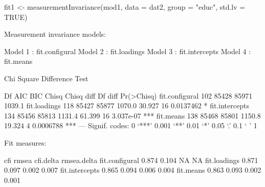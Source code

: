\begin{Schunk}
\begin{Sinput}
 fit1 <- measurementInvariance(mod1,
                               data = dat2,
                               group = "educ",
                               std.lv = TRUE)
\end{Sinput}
\begin{Soutput}
Measurement invariance models:

Model 1 : fit.configural
Model 2 : fit.loadings
Model 3 : fit.intercepts
Model 4 : fit.means

Chi Square Difference Test

                Df   AIC   BIC  Chisq Chisq diff Df diff Pr(>Chisq)    
fit.configural 102 85428 85971 1039.1                                  
fit.loadings   118 85427 85877 1070.0     30.927      16  0.0137462 *  
fit.intercepts 134 85456 85813 1131.4     61.399      16  3.037e-07 ***
fit.means      138 85468 85801 1150.8     19.324       4  0.0006788 ***
---
Signif. codes:  0 ‘***’ 0.001 ‘**’ 0.01 ‘*’ 0.05 ‘.’ 0.1 ‘ ’ 1


Fit measures:

                 cfi rmsea cfi.delta rmsea.delta
fit.configural 0.874 0.104        NA          NA
fit.loadings   0.871 0.097     0.002       0.007
fit.intercepts 0.865 0.094     0.006       0.004
fit.means      0.863 0.093     0.002       0.001
\end{Soutput}
\end{Schunk}
